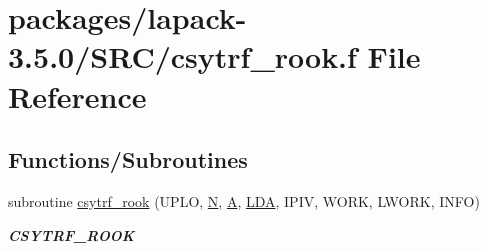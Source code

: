 \hypertarget{csytrf__rook_8f}{}\section{packages/lapack-\/3.5.0/\+S\+R\+C/csytrf\+\_\+rook.f File Reference}
\label{csytrf__rook_8f}
\subsection*{Functions/\+Subroutines}
\begin{DoxyCompactItemize}
\item 
subroutine \hyperlink{group__complexSYcomputational_gaaa37e0850860440f4893fef9d5f815d5}{csytrf\+\_\+rook} (U\+P\+L\+O, \hyperlink{polmisc_8c_a0240ac851181b84ac374872dc5434ee4}{N}, \hyperlink{classA}{A}, \hyperlink{example__user_8c_ae946da542ce0db94dced19b2ecefd1aa}{L\+D\+A}, I\+P\+I\+V, W\+O\+R\+K, L\+W\+O\+R\+K, I\+N\+F\+O)
\begin{DoxyCompactList}\small\item\em {\bfseries C\+S\+Y\+T\+R\+F\+\_\+\+R\+O\+O\+K} \end{DoxyCompactList}\end{DoxyCompactItemize}
